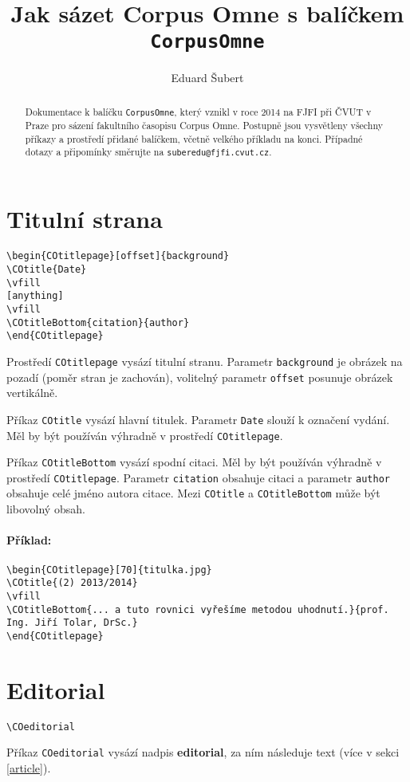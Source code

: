 \documentclass[a4paper]{article}
\title{Jak sázet \textbf{Corpus Omne} s balíčkem \texttt{CorpusOmne}}
\author{Eduard Šubert}
\begin{document}
\maketitle

\begin{abstract}
Dokumentace k balíčku \texttt{CorpusOmne}, který vznikl v roce 2014 na FJFI při ČVUT v Praze pro sázení fakultního časopisu Corpus Omne. Postupně jsou vysvětleny všechny příkazy a prostředí přidané balíčkem, včetně velkého příkladu na konci. Případné dotazy a připomínky směrujte na \texttt{suberedu@fjfi.cvut.cz}.
\end{abstract}

\section{Titulní strana}%
\begin{verbatim}
\begin{COtitlepage}[offset]{background}
\COtitle{Date}
\vfill
[anything]
\vfill
\COtitleBottom{citation}{author}
\end{COtitlepage}
\end{verbatim}

Prostředí \texttt{COtitlepage} vysází titulní stranu. Parametr \texttt{background} je obrázek na pozadí (poměr stran je zachován), volitelný parametr \texttt{offset} posunuje obrázek vertikálně.

Příkaz \texttt{COtitle} vysází hlavní titulek. Parametr \texttt{Date} slouží k označení vydání. Měl by být používán výhradně v prostředí \texttt{COtitlepage}.

Příkaz \texttt{COtitleBottom} vysází spodní citaci. Měl by být používán výhradně v prostředí \texttt{COtitlepage}. Parametr \texttt{citation} obsahuje citaci a parametr \texttt{author} obsahuje celé jméno autora citace.
Mezi \texttt{COtitle} a \texttt{COtitleBottom} může být libovolný obsah. 
\paragraph{Příklad:}
\begin{verbatim}
\begin{COtitlepage}[70]{titulka.jpg}
\COtitle{(2) 2013/2014}
\vfill
\COtitleBottom{... a tuto rovnici vyřešíme metodou uhodnutí.}{prof. Ing. Jiří Tolar, DrSc.}
\end{COtitlepage}
\end{verbatim}
%
\section{Editorial}%
\begin{verbatim}
\COeditorial
\end{verbatim}
Příkaz \texttt{COeditorial} vysází nadpis \textbf{editorial}, za ním následuje text (více v sekci \ref{article}).
%
\end{document}
